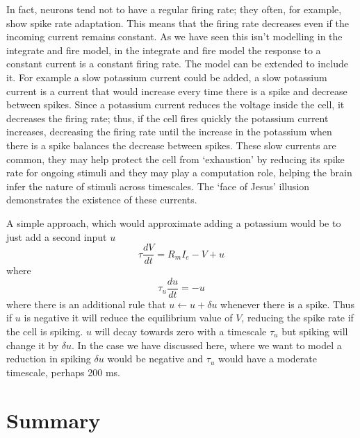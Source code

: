 \documentclass[12pt]{article}
\begin{document}
In fact, neurons tend not to have a regular firing rate; they often,
for example, show spike rate adaptation. This means that the firing
rate decreases even if the incoming current remains constant. As we
have seen this isn't modelling in the integrate and fire model, in the
integrate and fire model the response to a constant current is a
constant firing rate. The model can be extended to include it. For
example a slow potassium current could be added, a slow potassium
current is a current that would increase every time there is a spike
and decrease between spikes. Since a potassium current reduces the
voltage inside the cell, it decreases the firing rate; thus, if the
cell fires quickly the potassium current increases, decreasing the
firing rate until the increase in the potassium when there is a spike
balances the decrease between spikes. These slow currents are common,
they may help protect the cell from `exhaustion' by reducing its spike
rate for ongoing stimuli and they may play a computation role, helping
the brain infer the nature of stimuli across timescales. The `face of
Jesus' illusion demonstrates the existence of these currents.

A simple approach, which would approximate adding a potassium would be
to just add a second input $u$
\begin{equation}
  \tau\frac{dV}{dt}=R_mI_e-V+u
\end{equation}
where
\begin{equation}
  \tau_u\frac{du}{dt}=-u
\end{equation}
where there is an additional rule that $u\leftarrow u+\delta u$
whenever there is a spike. Thus if $u$ is negative it will reduce the
equilibrium value of $V$, reducing the spike rate if the cell is
spiking. $u$ will decay towards zero with a timescale $\tau_u$ but
spiking will change it by $\delta u$. In the case we have discussed
here, where we want to model a reduction in spiking $\delta u$ would
be negative and $\tau_u$ would have a moderate timescale, perhaps 200
ms.

\section*{Summary}
\end{document}
